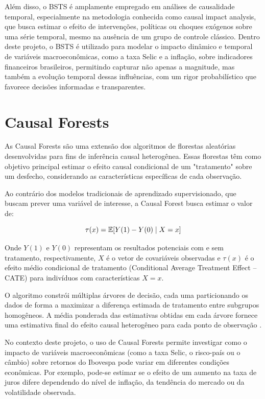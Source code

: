 \documentclass[	12pt, Times, openright, oneside, a4paper, english, brazil]{abntex2}
\begin{document}
Além disso, o BSTS é amplamente empregado em análises de causalidade temporal, especialmente na metodologia conhecida como causal impact analysis, que busca estimar o efeito de intervenções, políticas ou choques exógenos sobre uma série temporal, mesmo na ausência de um grupo de controle clássico. Dentro deste projeto, o BSTS é utilizado para modelar o impacto dinâmico e temporal de variáveis macroeconômicas, como a taxa Selic e a inflação, sobre indicadores financeiros brasileiros, permitindo capturar não apenas a magnitude, mas também a evolução temporal dessas influências, com um rigor probabilístico que favorece decisões informadas e transparentes.

\section{Causal Forests}

As Causal Forests são uma extensão dos algoritmos de florestas aleatórias desenvolvidas para fins de inferência causal heterogênea. Essas florestas têm como objetivo principal estimar o efeito causal condicional de um "tratamento" sobre um desfecho, considerando as características específicas de cada observação.

Ao contrário dos modelos tradicionais de aprendizado supervisionado, que buscam prever uma variável de interesse, a Causal Forest busca estimar o valor de:

\begin{equation}\hfill
\tau(x) = \mathbb{E}[Y(1) - Y(0) \mid X = x]
\label{eq:cate}
\end{equation}

Onde $Y(1)$ e $Y(0)$ representam os resultados potenciais com e sem tratamento, respectivamente, $X$ é o vetor de covariáveis observadas e $\tau(x)$ é o efeito médio condicional de tratamento (Conditional Average Treatment Effect – CATE) para indivíduos com características $X = x$.

O algoritmo constrói múltiplas árvores de decisão, cada uma particionando os dados de forma a maximizar a diferença estimada de tratamento entre subgrupos homogêneos. A média ponderada das estimativas obtidas em cada árvore fornece uma estimativa final do efeito causal heterogêneo para cada ponto de observação \cite{Athey2019Estimating}.

No contexto deste projeto, o uso de Causal Forests permite investigar como o impacto de variáveis macroeconômicas (como a taxa Selic, o risco-país ou o câmbio) sobre retornos do Ibovespa pode variar em diferentes condições econômicas. Por exemplo, pode-se estimar se o efeito de um aumento na taxa de juros difere dependendo do nível de inflação, da tendência do mercado ou da volatilidade observada.
\end{document}
